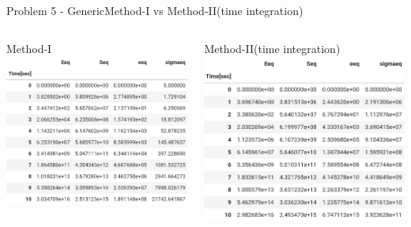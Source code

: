 \documentclass{beamer}
\begin{document}
\begin{frame}{Problem 5 - Generic}{Method-I vs Method-II(time integration)}
    \vspace{-2em}
    \begin{columns}
        \begin{block}{\footnotesize Method-I}
            \includegraphics[width=\textwidth]{Values/m2t5.png}
        \end{block}
        \begin{block}{\footnotesize Method-II(time integration)}
            \includegraphics[width=\textwidth]{Values/m1t5.png}
        \end{block}
    \end{columns}
\end{frame}
\end{document}

